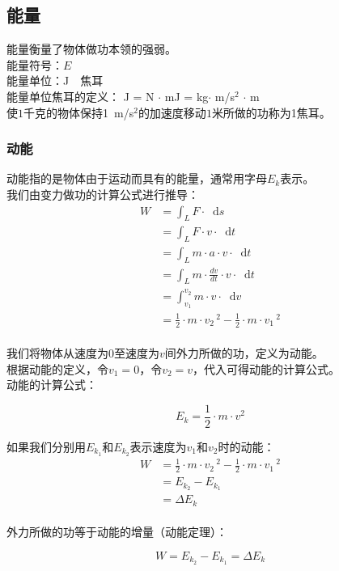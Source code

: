 \documentclass[UTF8]{ctexart}
\newcommand*{\dif}{\mathop{}\!\mathrm{d}}
\begin{document}
\newpage

\subsection{能量}
    能量衡量了物体做功本领的强弱。\\[4mm]
    能量符号：$E$\\[1mm]
    能量单位：J~~焦耳\\[4mm]
    能量单位焦耳的定义：
    J = N $\cdot$ m\qquad J = kg$\cdot$ m/s$^2$ $\cdot$ m\\[2mm]
    使$1$千克的物体保持1~m/s$^2$的加速度移动$1$米所做的功称为1焦耳。

\subsubsection{动能}
    动能指的是物体由于运动而具有的能量，通常用字母$E_k$表示。\\[3mm]
    我们由变力做功的计算公式进行推导：\vspace{5pt}
    \setcounter{equation}{0}
    \begin{align}
        W
        &=\int_L F\cdot \dif s\\[5mm]
        &=\int_L F\cdot v\cdot \dif t\\[5mm]
        &=\int_L m\cdot a\cdot v\cdot \dif t\\[5mm]
        &=\int_L m\cdot \frac{dv}{dt}\cdot v\cdot \dif t\\[5mm]
        &=\int_{v_1}^{v_2}m\cdot v\cdot \dif v\\[5mm]
        &=\frac{1}{2}\cdot m\cdot v_2\,^2-\frac{1}{2}\cdot m\cdot v_1\,^2
    \end{align}\\
    我们将物体从速度为$0$至速度为$v$间外力所做的功，定义为动能。\\[3mm]
    根据动能的定义，令$v_1=0$，令$v_2=v$，代入可得动能的计算公式。\\[5mm]
    动能的计算公式：
    \begin{large}
        \begin{equation*}
            E_k=\frac{1}{2}\cdot m\cdot v^2
        \end{equation*}
    \end{large}

\newpage

    如果我们分别用$E_{k_1}$和$E_{k_2}$表示速度为$v_1$和$v_2$时的动能：\vspace{5pt}
    \begin{align}
        W
        &=\frac{1}{2}\cdot m\cdot v_2\,^2-\frac{1}{2}\cdot m\cdot v_1\,^2\\[3mm]
        &=E_{k_2}-E_{k_1}\\[3mm]
        &=\Delta E_k
    \end{align}\\
    外力所做的功等于动能的增量（动能定理）：
    \begin{large}
        \begin{equation*}
            W=E_{k_2}-E_{k_1}=\Delta E_k
        \end{equation*}
    \end{large}
\end{document}
